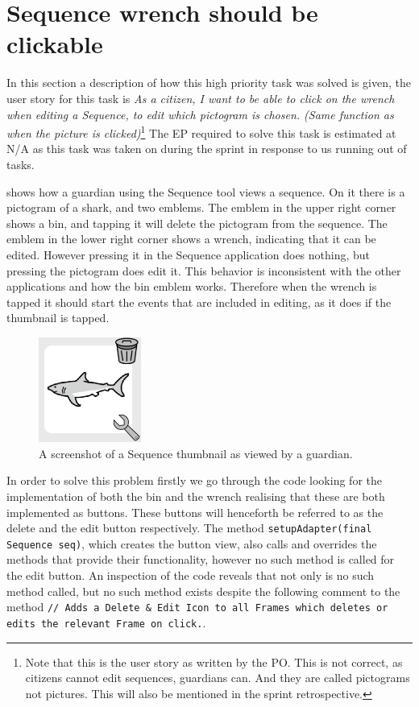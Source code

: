 \section{Sequence wrench should be clickable}
In this section a description of how this high priority task was solved is given, the user story for this task is \textit{As a citizen, I want to be able to click on the wrench when editing a Sequence, to edit which pictogram is chosen. (Same function as when the picture is clicked)}\footnote{Note that this is the user story as written by the PO. This is not correct, as citizens cannot edit sequences, guardians can. And they are called pictograms not pictures. This will also be mentioned in the sprint retrospective. } 
The EP required to solve this task is estimated at N/A as this task was taken on during the sprint in response to us running out of tasks.

 shows how a guardian using the Sequence tool views a sequence.
On it there is a pictogram of a shark, and two emblems. 
The emblem in the upper right corner shows a bin, and tapping it will delete the pictogram from the sequence. 
The emblem in the lower right corner shows a wrench, indicating that it can be edited.
However pressing it in the Sequence application does nothing, but pressing the pictogram does edit it. 
This behavior is inconsistent with the other applications and how the bin emblem works. 
Therefore when the wrench is tapped it should start the events that are included in editing, as it does if the thumbnail is tapped.
\begin{figure}
    \centering
    \includegraphics[width=0.3\textwidth]{figures/img/screenshots/Sequence_pictogram.png} 
    \caption{A screenshot of a Sequence thumbnail as viewed by a guardian.}
    \label{fig:seq_wrench} 
    \vspace{-5pt}
\end{figure}
\bigskip
\noindent
In order to solve this problem firstly we go through the code looking for the implementation of both the bin and the wrench realising that these are both implemented as buttons.
These buttons will henceforth be referred to as the delete and the edit button respectively.
The method \texttt{setupAdapter(final Sequence seq)}, which creates the button view, also calls and overrides the methods that provide their functionality, however no such method is called for the edit button.
An inspection of the code reveals that not only is no such method called, but no such method exists despite the following comment to the method \texttt{// Adds a Delete \& Edit Icon to all Frames which deletes or edits the relevant Frame on click.}.

